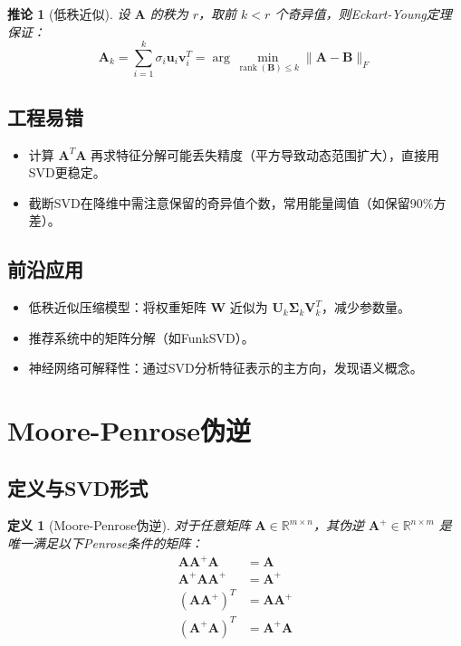 \documentclass[UTF8, 10pt]{ctexart}
\newtheorem{corollary}[theorem]{推论}
\newtheorem{definition}{定义}[section]
\newcommand{\R}{\mathbb{R}}
\newcommand{\rank}{\operatorname{rank}}
\begin{document}
\begin{corollary}[低秩近似]
设 $\bm{A}$ 的秩为 $r$，取前 $k < r$ 个奇异值，则Eckart-Young定理保证：
\[
\bm{A}_k = \sum_{i=1}^{k} \sigma_i \bm{u}_i \bm{v}_i^T = \arg\min_{\rank(\bm{B}) \le k} \|\bm{A} - \bm{B}\|_F
\]
\end{corollary}

\subsection{工程易错}
\begin{itemize}
    \item 计算 $\bm{A}^T\bm{A}$ 再求特征分解可能丢失精度（平方导致动态范围扩大），直接用SVD更稳定。
    \item 截断SVD在降维中需注意保留的奇异值个数，常用能量阈值（如保留90\%方差）。
\end{itemize}

\subsection{前沿应用}
\begin{itemize}
    \item 低秩近似压缩模型：将权重矩阵 $\bm{W}$ 近似为 $\bm{U}_k \bm{\Sigma}_k \bm{V}_k^T$，减少参数量。
    \item 推荐系统中的矩阵分解（如FunkSVD）。
    \item 神经网络可解释性：通过SVD分析特征表示的主方向，发现语义概念。
\end{itemize}

\section{Moore-Penrose伪逆}
\subsection{定义与SVD形式}
\begin{definition}[Moore-Penrose伪逆]
对于任意矩阵 $\bm{A} \in \R^{m \times n}$，其伪逆 $\bm{A}^+ \in \R^{n \times m}$ 是唯一满足以下Penrose条件的矩阵：
\begin{align}
    \bm{A} \bm{A}^+ \bm{A} &= \bm{A} \label{eq:p1}\\
    \bm{A}^+ \bm{A} \bm{A}^+ &= \bm{A}^+ \label{eq:p2}\\
    (\bm{A} \bm{A}^+)^T &= \bm{A} \bm{A}^+ \label{eq:p3}\\
    (\bm{A}^+ \bm{A})^T &= \bm{A}^+ \bm{A} \label{eq:p4}
\end{align}
\end{definition}
\end{document}
